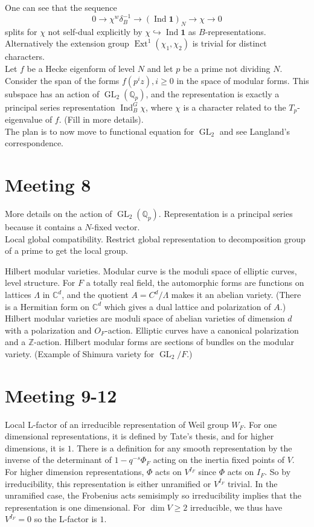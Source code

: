 \documentclass{amsart}
\numberwithin{equation}{section}
\theoremstyle{plain}
\theoremstyle{definition}
\theoremstyle{remark}
\newcommand{\Ext}{\operatorname{Ext}}
\newcommand{\Z}{\mathbb{Z}}
\newcommand{\Q}{\mathbb{Q}}
\renewcommand{\_}[2]{\underbrace{#1}_{#2}}
\renewcommand{\^}[2]{\overbrace{#1}_{#2}}
\newcommand{\C}{\mathbb{C}}
\newcommand{\Ind}{\operatorname{Ind}}
\newcommand{\GL}{\operatorname{GL}}
\begin{document}
One can see that the sequence \[0 \to \chi^w \delta_B^{-1} \to (\Ind \mathbf 1 )_N \to \chi \to 0\] splits for $\chi$ not self-dual explicitly by $\chi \hookrightarrow \Ind \mathbf 1$ as $B$-representations. Alternatively the extension group $\Ext^1(\chi_1, \chi_2)$ is trivial for distinct characters.\\

Let $f$ be a Hecke eigenform of level $N$ and let $p$ be a prime not dividing $N$. Consider the span of the forms $f(p^iz), i \geq 0$ in the space of modular forms. This subspace has an action of $\GL_2(\Q_p)$, and the representation is exactly a principal series representation $\Ind_B^G \chi$, where $\chi$ is a character related to the $T_p$-eigenvalue of $f$. (Fill in more details).\\

The plan is to now move to functional equation for $\GL_2$ and see Langland's correspondence.

\section{Meeting 8}
More details on the action of $\GL_2(\Q_p)$. Representation is a principal series because it contains a $N$-fixed vector.\\

Local global compatibility. Restrict global representation to decomposition group of a prime to get the local group.

Hilbert modular varieties. Modular curve is the moduli space of elliptic curves, level structure. For $F$ a totally real field, the automorphic forms are functions on lattices $\Lambda$ in $\C^d$, and the quotient $A = C^d/\Lambda$ makes it an abelian variety. (There is a Hermitian form on $\C^d$ which gives a dual lattice and polarization of $A$.) Hilbert modular varieties are moduli space of abelian varieties of dimension $d$ with a polarization and $O_F$-action. Elliptic curves have a canonical polarization and a $\Z$-action. Hilbert modular forms are sections of bundles on the modular variety. (Example of Shimura variety for $\GL_2/F$.)\\

\section{Meeting 9-12}
Local L-factor of an irreducible representation of Weil group $W_F$. For one dimensional representations, it is defined by Tate's thesis, and for higher dimensions, it is $1$. There is a definition for any smooth representation by the inverse of the determinant of $1 - q^{-s}\Phi_F$ acting on the inertia fixed points of $V$. For higher dimension representations, $\Phi$ acts on $V^{I_F}$ since $\Phi$ acts on $I_F$. So by irreducibility, this representation is either unramified or $V^{I_F}$ trivial. In the unramified case, the Frobenius acts semisimply so irreducibility implies that the representation is one dimensional. For $\dim V \geq 2$ irreducible, we thus have $V^{I_F} = 0$ so the L-factor is $1$.\\
\end{document}
